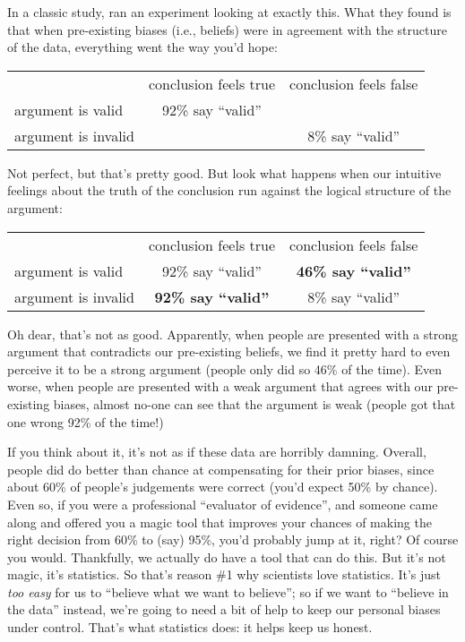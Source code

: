 In a classic study,  ran an experiment looking at exactly this. What they found is that when pre-existing biases (i.e., beliefs) were in agreement with the structure of the data, everything went the way you'd hope: 
\begin{center}
\renewcommand{\arraystretch}{1.5}
\begin{tabular}{l|cc|}
\multicolumn{1}{c}{} & \multicolumn{1}{c}{conclusion feels true} & \multicolumn{1}{c}{conclusion feels false} \\ \cline{2-3}
argument is valid   & 92\% say ``valid''&  \\ 
argument is invalid &  & 8\% say ``valid''\\ \cline{2-3}
\end{tabular}
\end{center}
Not perfect, but that's pretty good. But look what happens when our intuitive feelings about the truth of the conclusion run against the logical structure of the argument:
\begin{center}
\renewcommand{\arraystretch}{1.5}
\begin{tabular}{l|cc|}
\multicolumn{1}{c}{} & \multicolumn{1}{c}{conclusion feels true} & \multicolumn{1}{c}{conclusion feels false} \\ \cline{2-3}
argument is valid   & 92\% say ``valid'' & {\bf 46\% say ``valid''} \\
argument is invalid & {\bf 92\% say ``valid''} & 8\% say ``valid'' \\ \cline{2-3}
\end{tabular}
\end{center}
Oh dear, that's not as good. Apparently, when people are presented with a strong argument that contradicts our pre-existing beliefs, we find it pretty hard to even perceive it to be a strong argument (people only did so 46\% of the time). Even worse, when people are presented with a weak argument that agrees with our pre-existing biases, almost no-one can see that the argument is weak (people got that one wrong 92\% of the time!)

If you think about it, it's not as if these data are horribly damning. Overall, people did do better than chance at compensating for their prior biases, since about 60\% of people's judgements were correct (you'd expect 50\% by chance). Even so, if you were a professional ``evaluator of evidence'', and someone came along and offered you a magic tool that improves your chances of making the right decision from 60\% to (say) 95\%, you'd probably jump at it, right? Of course you would. Thankfully, we actually do have a tool that can do this. But it's not magic, it's statistics. So that's reason \#1 why scientists love statistics. It's just {\it too easy} for us to ``believe what we want to believe''; so if we want to ``believe in the data'' instead, we're going to need a bit of help to keep our personal biases under control. That's what statistics does: it helps keep us honest.



